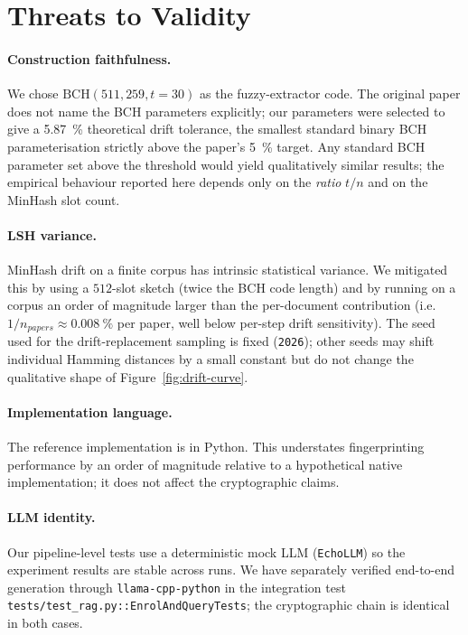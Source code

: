 \section{Threats to Validity}
\label{sec:threats}

\paragraph{Construction faithfulness.}  We chose
$\mathrm{BCH}(511, 259, t=30)$ as the fuzzy\nobreakdash-extractor
code.  The original paper does not name the BCH parameters
explicitly; our parameters were selected to give a \SI{5.87}{\percent}
theoretical drift tolerance, the smallest standard binary BCH
parameterisation strictly above the paper's \SI{5}{\percent}
target.  Any standard BCH parameter set above the threshold would
yield qualitatively similar results; the empirical behaviour reported
here depends only on the \emph{ratio} $t/n$ and on the MinHash slot
count.

\paragraph{LSH variance.}  MinHash drift on a finite corpus has
intrinsic statistical variance.  We mitigated this by using a
$512$\nobreakdash-slot sketch (twice the BCH code length) and by
running on a corpus an order of magnitude larger than the per\nobreakdash-document
contribution (i.e.\ $1/n_{\mathit{papers}} \approx
\SI{0.008}{\percent}$ per paper, well below per\nobreakdash-step drift
sensitivity).  The seed used for the drift\nobreakdash-replacement
sampling is fixed (\texttt{2026}); other seeds may shift individual
Hamming distances by a small constant but do not change the
qualitative shape of Figure~\ref{fig:drift-curve}.

\paragraph{Implementation language.}  The reference implementation is
in Python.  This understates fingerprinting performance by an order
of magnitude relative to a hypothetical native implementation; it
does not affect the cryptographic claims.

\paragraph{LLM identity.}  Our pipeline\nobreakdash-level tests use a
deterministic mock LLM (\texttt{EchoLLM}) so the experiment results
are stable across runs.  We have separately verified end\nobreakdash-to\nobreakdash-end
generation through \texttt{llama\nobreakdash-cpp\nobreakdash-python}
in the integration test
\texttt{tests/test\_rag.py::EnrolAndQueryTests}; the cryptographic
chain is identical in both cases.

